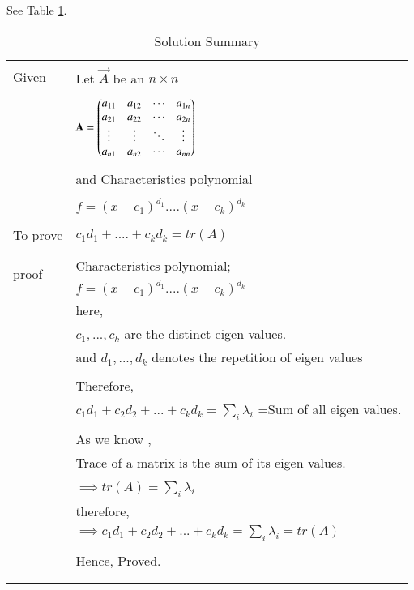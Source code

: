 See Table \ref{eq:solutions/6/3/9/table:1}.

\onecolumn
\begin{longtable}{|l|l|}
\hline
\multirow{3}{*}{Given} & \\
& Let $\vec{A}$ be an $n\times n$ \\
&\\
& $\mathbf{A} = \begin{pmatrix}a_{11}&a_{12}&\cdots &a_{1n} \\
a_{21}&a_{22}&\cdots &a_{2n} \\
\vdots & \vdots & \ddots & \vdots\\
a_{n1}&a_{n2}&\cdots &a_{nn}\end{pmatrix}$\\
&\\
& and Characteristics polynomial\\
&\\
&  $f= (x-c_1)^{d_1}....(x-c_k)^{d_k}$\\
&\\
\hline
\multirow{3}{*}{To prove} & \\
& $c_1d_1+....+c_kd_k = tr(A)$\\
&\\
\hline
\multirow{3}{*}{proof} & \\
& Characteristics polynomial; \\
&  $f= (x-c_1)^{d_1}....(x-c_k)^{d_k}$\\
& here,\\
& $c_1,...,c_k$ are the distinct eigen values.\\
& and $d_1,...,d_k$ denotes the repetition of eigen values\\
&\\
& Therefore,\\
& $\boxed{c_1d_1+c_2d_2+...+c_kd_k = \sum_{i} \lambda_i}$ =Sum of all eigen values.\\
&\\
& As we know , \\
& Trace of a matrix is the sum of its eigen values. \\
&\\
& $\implies tr(A) = \sum _{i} \lambda_i$\\
& therefore,\\
& $\boxed{\implies c_1d_1+c_2d_2+...+c_kd_k = \sum_{i} \lambda_i = tr(A)}$\\
&\\
& Hence, Proved.\\
&\\
\hline
\caption{Solution Summary}
\label{eq:solutions/6/3/9/table:1}
\end{longtable}
